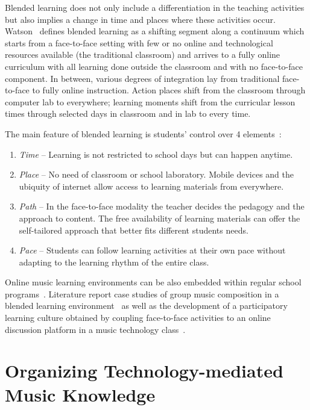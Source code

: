 \documentclass[10pt,journal,compsoc]{IEEEtran}
\begin{document}
Blended learning does not only include a differentiation in the teaching activities but also implies a change in time and places where these activities occur. Watson~\cite{watson2008blended} defines blended learning as a shifting segment along a continuum which starts from a face-to-face setting with few or no online and technological resources available (the traditional classroom) and arrives to a fully online curriculum with all learning done outside the classroom and with no face-to-face component. In between,  various degrees of integration lay from traditional face-to-face to fully online instruction. Action places shift from the classroom through computer lab to everywhere; learning moments shift from the curricular lesson times through selected days in classroom and in lab to every time. 

The main feature of blended learning is students' control over 4 elements~\cite{roadmap}:
\begin{enumerate}
	\item \textit{Time} -- Learning is not restricted to school days but can happen anytime.
	\item \textit{Place} -- No need of classroom or school laboratory. Mobile devices and the ubiquity of internet allow access to learning materials from everywhere.
	\item \textit{Path} -- In the face-to-face modality the teacher decides the pedagogy and the approach to content. The free availability of learning materials can offer the self-tailored approach that better fits different students needs.
	\item \textit{Pace} -- Students can follow learning activities at their own pace without adapting to the learning rhythm of the entire class. 
\end{enumerate}

Online music learning environments can be also embedded within regular school programs~\cite{crawford2017rethinking}. Literature report case studies of group music composition in a blended learning environment~\cite{ruokonen2016learning} as well as the development of a participatory learning culture obtained by coupling face-to-face activities to an online discussion platform in a music technology class~\cite{draper2008hidden}.



\section{Organizing Technology-mediated Music Knowledge}
\label{sec:OMTK}
\end{document}
